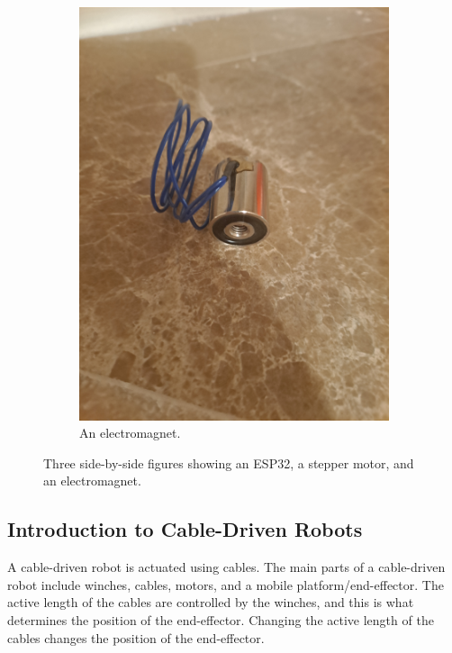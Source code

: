 \documentclass[11pt]{article}
\begin{document}
\begin{figure}[h!]
\begin{subfigure}[b]{0.3\textwidth}
    \includegraphics[width=\textwidth]{ElectromagnetImg.jpg}
    \caption{An electromagnet.}
    \label{fig:figure3}
\end{subfigure}

\caption{Three side-by-side figures showing an ESP32, a stepper motor, and an electromagnet.}
\label{fig:side_by_side}
\end{figure}
  


\subsection{Introduction to Cable-Driven Robots}
A cable-driven robot is actuated using cables. The main parts of a cable-driven robot include winches, cables, motors, and 
a mobile platform/end-effector. The active length of the cables are controlled by the winches, and this is what determines the position of
the end-effector. Changing the active length of the cables changes the position of the end-effector.
\end{document}
